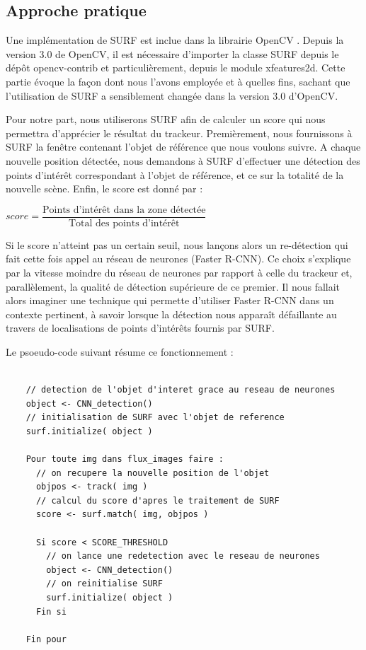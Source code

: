 	\subsection{Approche pratique}
	
	Une implémentation de SURF est inclue dans la librairie OpenCV \cite{Bib_SURFOpenCV}. Depuis la version 3.0 de OpenCV, il est nécessaire d'importer la classe SURF depuis le dépôt opencv-contrib et particulièrement, depuis
	le module xfeatures2d. Cette partie évoque la façon dont nous l'avons employée et à quelles fins, sachant que l'utilisation de SURF a sensiblement changée dans la version 3.0 d'OpenCV.   
	
	Pour notre part, nous utiliserons SURF afin de calculer un score qui nous permettra d'apprécier le résultat du trackeur. Premièrement, nous fournissons à SURF la fenêtre contenant l'objet de référence que nous voulons suivre.
	A chaque nouvelle position détectée, nous demandons à SURF d'effectuer une détection des points d'intérêt correspondant à l'objet de référence, et ce sur la totalité de la nouvelle scène. Enfin, le score est donné par : 
	\begin{center} 
	  $ score = \dfrac{\text{Points d'intérêt dans la zone détectée}}{\text{Total des points d'intérêt}}$
	\end{center}
	
	Si le score n'atteint pas un certain seuil, nous lançons alors un re-détection qui fait cette fois appel au réseau de neurones (Faster R-CNN). Ce choix s'explique par la vitesse moindre du 
	réseau de neurones par rapport à celle du trackeur et, parallèlement, la qualité de détection supérieure de ce premier. Il nous fallait alors imaginer une technique qui permette d'utiliser Faster R-CNN dans un contexte pertinent, 
	à savoir lorsque la détection nous apparaît défaillante au travers de localisations de points d'intérêts fournis par SURF. 
	
	Le psoeudo-code suivant résume ce fonctionnement :
	
	\begin{lstlisting}
	
	// detection de l'objet d'interet grace au reseau de neurones
	object <- CNN_detection()
	// initialisation de SURF avec l'objet de reference
	surf.initialize( object )  
	
	Pour toute img dans flux_images faire : 
	  // on recupere la nouvelle position de l'objet 
	  objpos <- track( img )
	  // calcul du score d'apres le traitement de SURF
	  score <- surf.match( img, objpos )
	  
	  Si score < SCORE_THRESHOLD
	    // on lance une redetection avec le reseau de neurones
	    object <- CNN_detection()
	    // on reinitialise SURF
	    surf.initialize( object )
	  Fin si
	
	Fin pour
	
	\end{lstlisting}
	